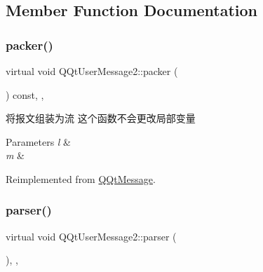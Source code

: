 \subsection{Member Function Documentation}
\mbox{\label{class_q_qt_user_message2_a11bf04e6af5533c01b88445826019406}} 
\subsubsection{\texorpdfstring{packer()}{packer()}}
{\footnotesize\ttfamily virtual void Q\+Qt\+User\+Message2\+::packer (\begin{DoxyParamCaption}\item[{Q\+Byte\+Array \&}]{ }\end{DoxyParamCaption}) const\hspace{0.3cm}{\ttfamily [inline]}, {\ttfamily [override]}, {\ttfamily [virtual]}}



将报文组装为流 这个函数不会更改局部变量 


\begin{DoxyParams}{Parameters}
{\em l} & \\
\hline
{\em m} & \\
\hline
\end{DoxyParams}


Reimplemented from \mbox{\hyperlink{class_q_qt_message_af1885c2c3628495808dca66ee8d72e14}{Q\+Qt\+Message}}.

\mbox{\label{class_q_qt_user_message2_a4b39c77bf87a9c676326c062cb64e9fa}} 
\subsubsection{\texorpdfstring{parser()}{parser()}}
{\footnotesize\ttfamily virtual void Q\+Qt\+User\+Message2\+::parser (\begin{DoxyParamCaption}\item[{const Q\+Byte\+Array \&}]{ }\end{DoxyParamCaption})\hspace{0.3cm}{\ttfamily [inline]}, {\ttfamily [override]}, {\ttfamily [virtual]}}



